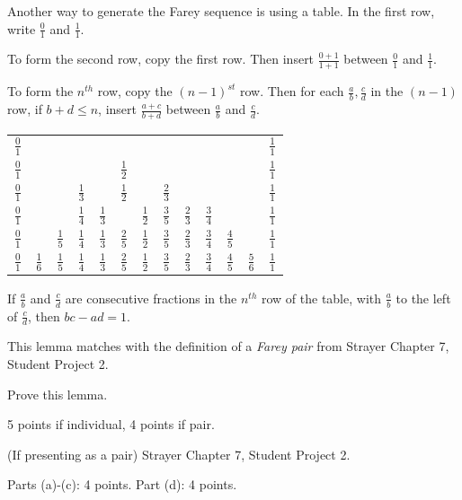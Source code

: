 \documentclass[letterpaper, 11 pt]{ximera}
\begin{document}
\begin{exploration}
 Another way to generate the Farey sequence is using a table. In the first row, write $\frac 01$ and $\frac 11$.

To form the second row, copy the first row. Then insert $\frac{0+1}{1+1}$ between $\frac 01$ and $\frac 11$.

To form the $n^{th}$ row, copy the $(n-1)^{st}$ row. Then for each $\frac ab, \frac cd$ in the $(n-1)$ row, if $b+d\leq n$, insert $\frac{a+c}{b+d}$ between $\frac ab$ and $\frac cd$.

\begin{table}
 \begin{tabular}{ c c c c c c c c c c c c c }
 $\frac{0}{1}$ &&&&&&&&&&&& $\frac{1}{1}$\\
 $\frac{0}{1}$ & & & & &$\frac{1}{2}$&&&&&&& $\frac{1}{1}$\\
 $\frac{0}{1}$ & & & $\frac{1}{3}$& &$\frac{1}{2}$& & $\frac{2}{3}$&&&&& $\frac{1}{1}$\\
  $\frac 01$ &  & & $ \frac 14$ & $ \frac 13$ & & $ \frac 12$ & $ \frac 35$ & $\frac 23$ & $ \frac 34$ &  &  & $ \frac 11 $\\
  $\frac 01$ &  & $ \frac 15$ & $ \frac 14$ & $ \frac 13$ & $ \frac 25$ & $ \frac 12$ & $ \frac 35$ & $\frac 23$ & $ \frac 34$ & $ \frac 45$ &  & $ \frac 11 $\\
 $\frac 01$ & $ \frac 16$ & $ \frac 15$ & $ \frac 14$ & $ \frac 13$ & $ \frac 25$ & $ \frac 12$ & $ \frac 35$ & $\frac 23$ & $ \frac 34$ & $ \frac 45$ & $\frac 56$ & $ \frac 11 $
\end{tabular}
\end{table}

\begin{lemma}
 If $\frac{a}{b}$ and $\frac{c}{d}$ are consecutive fractions in the $n^{th}$ row of the table, with $\frac ab$ to the left of $\frac cd$, then $bc-ad=1$.
\end{lemma}
This lemma matches with the definition of a \emph{Farey pair} from Strayer Chapter 7, Student Project 2.

\begin{problem}
	Prove this lemma.
	
	
\begin{rubric}
 5 points if individual, 4 points if pair.
\end{rubric}
\end{problem}

\begin{problem}(If presenting as a pair)
	Strayer Chapter 7, Student Project 2.
\begin{rubric}
 Parts (a)-(c): 4 points.
 Part (d): 4 points.
\end{rubric}
\end{problem}


\end{exploration}
\end{document}

